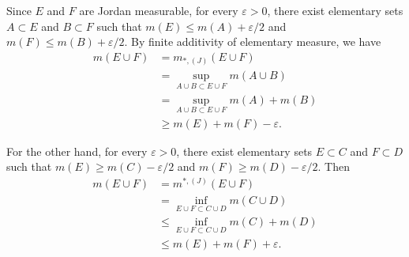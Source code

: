 \documentclass{book}
\theoremstyle{defstyle}
\theoremstyle{thmstyle}
\newcommand{\JIM}{m_{*, (J)}}%
\newcommand{\JOM}{m^{*, (J)}}%
\begin{document}
\begin{comment}
(iii) Since $E \cup F$ is Jordan measurable, by Definition \ref{def:jordan measure}, we have $m(E \cup F) = \JIM(E \cup F)$, and
    \begin{align*}
        \JIM(E \cup F) = \sup_{A \cup B \subset E \cup F : A, B \text{ elementary}}m(A \cup B).
    \end{align*}
Since for arbitrary $A, B$, we have $m(A \cup B) \leq m(A) + m(B)$, this means that $m(A) + m(B)$ is a supremum of $m(A \cup B)$ when $A$ and $B$ are disjoint. Thus when $A$ and $B$ are disjoint, we have
    \begin{align*}
        \JIM(E \cup F) &= \sup_{A \cup B \subset E \cup F}m(A \cup B)\\
        &= \sup_{A \subset E, B \subset F}m(A \cup B)\\
        &= \sup_{A \subset E}m(A) + \sup_{B \subset F}m(B)\\
        &= \JIM(E) + \JIM(F).
    \end{align*}
The third equality is hold for that $E$ and $F$ are disjoint. Thus $m(E \cup F) = m(E) + m(F)$ for disjoint sets $E$ and $F$.
\end{comment}

Since $E$ and $F$ are Jordan measurable, for every $\varepsilon > 0$, there exist elementary sets $A \subset E$ and $B \subset F$ such that $m(E) \leq m(A) + \varepsilon/2$ and $m(F) \leq m(B) + \varepsilon/2$. By finite additivity of elementary measure, we have 
    \begin{align*}
        m(E \cup F)
        &= \JIM(E \cup F)\\
        &= \sup_{A \cup B \subset E \cup F} m(A \cup B)\\
        &= \sup_{A \cup B \subset E \cup F} m(A) + m(B)\\
        &\geq m(E) + m(F) - \varepsilon.
    \end{align*}

For the other hand, for every $\varepsilon > 0$, there exist elementary sets $E \subset C$ and $F \subset D$ such that $m(E) \geq m(C) - \varepsilon/2$ and $m(F) \geq m(D) - \varepsilon/2$. Then
    \begin{align*}
        m(E \cup F)
        &= \JOM(E \cup F)\\
        &= \inf_{E \cup F \subset C \cup D}m(C \cup D)\\
        &\leq \inf_{E \cup F \subset C \cup D}m(C) + m(D)\\
        &\leq m(E) + m(F) + \varepsilon.
    \end{align*}
\end{document}

